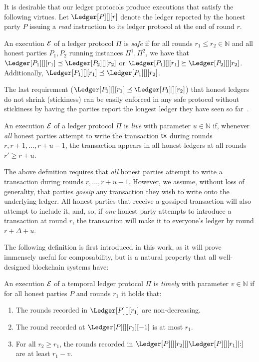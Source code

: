 It is desirable that our
ledger protocols produce executions that satisfy the following virtues.
Let $\Ledger[P][][r]$ denote the ledger reported by the honest party $P$
issuing a \emph{read} instruction to its ledger protocol at the end of round $r$.

\begin{definition}[Safe]
  An execution $\mathcal{E}$ of a ledger protocol $\Pi$ is \emph{safe} if for all rounds $r_1 \leq r_2 \in \mathbb{N}$
  and all honest parties $P_1, P_2$ running instances $\Pi^1, \Pi^2$,
  we have that
  $\Ledger[P_1][][r_1] \preceq \Ledger[P_2][][r_2]$ or
  $\Ledger[P_1][][r_1] \succeq \Ledger[P_2][][r_2]$.
  Additionally, $\Ledger[P_1][][r_1] \preceq \Ledger[P_1][][r_2]$.
\end{definition}

The last requirement ($\Ledger[P_1][][r_1] \preceq \Ledger[P_1][][r_2]$)
that honest ledgers do not shrink (stickiness) can be easily enforced
in any safe protocol without stickiness by having the parties report the longest ledger they have seen so far~\cite{streamlet}.

\begin{definition}[Live]
  An execution $\mathcal{E}$ of a ledger protocol $\Pi$ is \emph{live} with parameter $u \in \mathbb{N}$ if, whenever
  \emph{all} honest parties attempt to write the transaction $\textsf{tx}$ during
  rounds $r, r + 1, \ldots, r + u - 1$, the transaction appears in all
  honest ledgers at all rounds $r' \geq r + u$.
\end{definition}

The above definition requires that \emph{all} honest parties attempt to
write a transaction during rounds $r, \ldots, r + u - 1$. However, we
assume, without loss of generality,
that parties \emph{gossip} any transaction they wish to write onto
the underlying ledger. All honest parties that receive a gossiped transaction
will also attempt to include it, and, so, if \emph{one} honest party
attempts to introduce a transaction at round $r$, the transaction will
make it to everyone's ledger by round $r + \Delta + u$.

The following definition is first introduced in this work, as it will prove
immensely useful for composability, but is a natural property that all well-designed
blockchain systems have:

\begin{definition}[Timely]\label{def:timely}
  An execution $\mathcal{E}$ of a temporal ledger protocol $\Pi$ is \emph{timely} with parameter $v \in \mathbb{N}$
  if for all honest parties $P$ and rounds $r_1$ it holds that:

  \begin{enumerate}
    \item The rounds recorded in $\Ledger[P][][r_1]$ are non-decreasing.\label{def:timely-increasing}
    \item The round recorded at $\Ledger[P][][r_1][-1]$ is at most $r_1$.\label{def:timely-past}
    \item For all $r_2 \geq r_1$, the rounds recorded in $\Ledger[P][][r_2][|\Ledger[P][][r_1]|{:}]$ are at least $r_1 - v$.\label{def:timely-chunk}
  \end{enumerate}
\end{definition}

